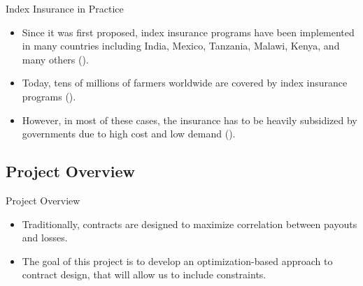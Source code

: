 \documentclass{beamer}
\begin{document}
\begin{frame}{Index Insurance in Practice}
\begin{itemize}
    \setlength\itemsep{1.5em}
    \item Since it was first proposed, index insurance programs have been implemented in many countries including India, Mexico, Tanzania, Malawi, Kenya, and many others (\cite{jensen2017agricultural}). 
    
    \item Today, tens of millions of farmers worldwide are covered by index insurance programs (\cite{greatrex2015scaling}). 
    
    \item However, in most of these cases, the insurance has to be heavily subsidized by governments due to high cost and low demand (\cite{greatrex2015scaling}). 
\end{itemize}
\end{frame}

\subsection{Project Overview}
\begin{frame}{Project Overview}
 \begin{itemize}
    \setlength\itemsep{1em}   
    \item Traditionally, contracts are designed to maximize correlation between payouts and losses. %
    \item The goal of this project is to develop an optimization-based approach to contract design, that will allow us to include constraints.
 \end{itemize}
\end{frame}

\end{document}
